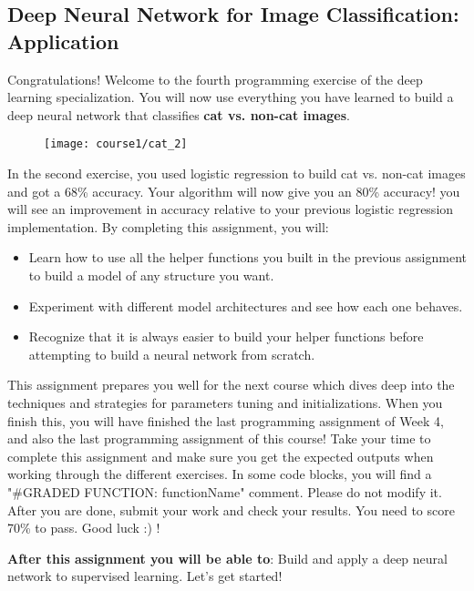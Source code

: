 \subsection{Deep Neural Network for Image Classification: Application}

Congratulations! Welcome to the fourth programming exercise of the deep learning specialization. You will now use everything you have learned to build a deep neural network that classifies {\textbf{cat vs. non-cat images}}.

\begin{figure}[h]
\begin{center}
\texttt{[image: course1/cat\_2]}
\end{center}
\end{figure}

In the second exercise, you used logistic regression to build cat vs. non-cat images and got a 68\% accuracy. Your algorithm will now give you an 80\% accuracy! you will see an improvement in accuracy relative to your previous logistic regression implementation. By completing this assignment, you will:
\begin{itemize}
\item Learn how to use all the helper functions you built in the previous assignment to build a model of any structure you want.
\item Experiment with different model architectures and see how each one behaves.
\item Recognize that it is always easier to build your helper functions before attempting to build a neural network from scratch.
\end{itemize}

This assignment prepares you well for the next course which dives deep into the techniques and strategies for parameters tuning and initializations. When you finish this, you will have finished the last programming assignment of Week 4, and also the last programming assignment of this course! Take your time to complete this assignment and make sure you get the expected outputs when working through the different exercises. In some code blocks, you will find a "\#GRADED FUNCTION: functionName" comment. Please do not modify it. After you are done, submit your work and check your results. You need to score 70\% to pass. Good luck :) !


{\textbf {After this assignment you will be able to}}: {\color{red}Build and apply a deep neural network to supervised learning}.
Let's get started!


